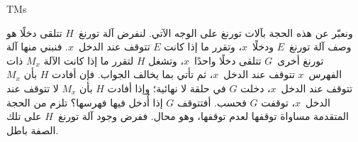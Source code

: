 \documentclass[../../../include/open-logic-section]{subfiles}
\begin{document}
\begin{tagblock}{TMs}
\begin{explain}
ونعبّر عن هذه الحجة بآلات تورنغ على الوجه الآتي. لنفرض آلة تورنغ~$H$ تتلقى
دخلًا هو وصف آلة تورنغ~$E$ ودخلًا~$x$، وتقرر ما إذا كانت $E$ تتوقف
عند الدخل~$x$. فنبني منها آلة تورنغ أخرى~$G$ تتلقى دخلًا
واحدًا~$x$، وتشغل $H$ لتقرر ما إذا كانت الآلة $M_x$ ذات الفهرس~$x$
تتوقف عند الدخل~$x$، ثم تأتي بما يخالف الجواب. فإن أفادت $H$ بأن
$M_x$ تتوقف عند الدخل~$x$، دخلت $G$ في حلقة لا نهائية؛ وإذا أفادت
$H$ بأن $M_x$ لا تتوقف عند الدخل~$x$، توقفت $G$ فحسب. أفتتوقف $G$
إذا أُدخل فيها فهرسها؟ تلزم من الحجة المتقدمة مساواة توقفها لعدم
توقفها، وهو محال. ففرض وجود آلة تورنغ~$H$ على تلك الصفة
باطل.
\end{explain}
\end{tagblock}
\end{document}
